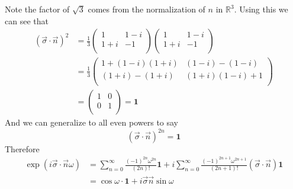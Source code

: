 \documentclass[11pt]{article}
\numberwithin{equation}{section}
\begin{document}
Note the factor of $\sqrt{3}$ comes from the normalization of $n$ in $\mathbb{R}^3$.  Using
this we can see that
\begin{align*}
(\vec{\sigma}\cdot\vec{n})^2 &= \frac{1}{3}\left(\begin{array}{cc}
                                   1     &1-i\\
                                   1+i  &-1\\
                                 \end{array}\right)
 \left(\begin{array}{cc}
                                   1     &1-i\\
                                   1+i  &-1\\
                                 \end{array}\right)\\
&=\frac{1}{3}\left(\begin{array}{cc}
                                   1+(1-i)(1+i)     &(1-i)-(1-i)\\
                                   (1+i)-(1+i)  &(1+i)(1-i)+1\\
                                 \end{array}\right)\\
&=\left(\begin{array}{cc}
                                    1   &0\\
                                    0   &1\\
                                 \end{array}\right) = \mathbf{1}
\end{align*}
And we can generalize to all even powers to say
$$(\vec{\sigma}\cdot\vec{n})^{2n} = \mathbf{1}$$ 
Therefore
\begin{align*}
\exp(i\vec{\sigma}\cdot\vec{n}\omega) &= \sum_{n=0}^{\infty}\frac{(-1)^{2n}\omega^{2n}}{(2n)!}\mathbf{1} + i\sum_{n=0}^{\infty}\frac{(-1)^{2n+1}\omega^{2n+1}}{(2n+1)!}(\vec{\sigma}\cdot\vec{n})\mathbf{1}\\
&=\cos\omega\cdot\mathbf{1}+i\vec{\sigma}\vec{n}\sin\omega
\end{align*}


\pagebreak
\end{document}
